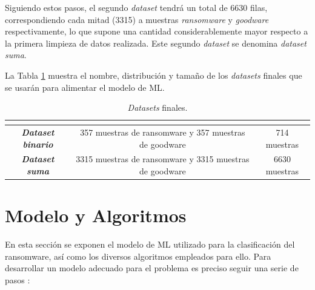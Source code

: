 Siguiendo estos pasos, el segundo \textit{dataset} tendrá un total de 6630 filas, correspondiendo cada mitad (3315) a muestras \textit{ransomware} y \textit{goodware} respectivamente, lo que supone una cantidad considerablemente mayor respecto a la primera limpieza de datos realizada. Este segundo \textit{dataset} se denomina \textit{dataset suma}.

La Tabla \ref{tab:datasetsfin} muestra el nombre, distribución y tamaño de los \textit{datasets} finales que se usarán para alimentar el modelo de \gls{ML}.

\begin{table}[htb!]
\centering
\scriptsize %
\caption{\textit{Datasets} finales.}
\begin{tabular}{|c|c|c|}
\hline
\rowcolor[HTML]{C0C0C0}
\multicolumn{1}{|c|}{\cellcolor[HTML]{C0C0C0}{\textbf{Nombre}}} & \multicolumn{1}{c|}{\cellcolor[HTML]{C0C0C0}{\textbf{Distribución}}} & 
\multicolumn{1}{|c|}{\cellcolor[HTML]{C0C0C0}{\textbf{Tamaño}}} \\ \hline
    \textbf{\textit{Dataset binario}} & 357 muestras de ransomware y 357 muestras de goodware & 714 muestras \\ \hline
    \textbf{\textit{Dataset suma}} & 3315 muestras de ransomware y 3315 muestras de goodware & 6630 muestras\\ \hline
\end{tabular}
\label{tab:datasetsfin}
\end{table}






\section{Modelo y Algoritmos} \label{sec:model}
\noindent En esta sección se exponen el modelo de \gls{ML} utilizado para la clasificación del ransomware, así como los diversos algoritmos empleados para ello. 
Para desarrollar un modelo adecuado para el problema es preciso seguir una serie de pasos \cite{MLMODEL2019} \cite{Thomas_2020}:

